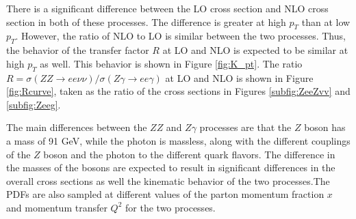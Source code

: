 \documentclass[12pt,a4paper,openright,twoside]{report}
\begin{document}
There is a significant difference between the LO cross section and NLO cross section in both of these processes. The difference is greater at high $p_T$ than at low $p_T$. However, the ratio of NLO to LO is similar between the two processes. Thus, the behavior of the transfer factor $R$ at LO and NLO is expected to be similar at high $p_T$ as well. This behavior is shown in Figure \ref{fig:K_pt}. The ratio $R = \sigma(ZZ\rightarrow ee\nu\nu)/\sigma(Z\gamma\rightarrow ee\gamma)$ at LO and NLO is shown in Figure \ref{fig:Rcurve}, taken as the ratio of the cross sections in Figures \ref{subfig:ZeeZvv} and \ref{subfig:Zeeg}.

The main differences between the $ZZ$ and $Z\gamma$ processes are that the $Z$ boson has a mass of 91 GeV, while the photon is massless, along with the different couplings of the $Z$ boson and the photon to the different quark flavors. The difference in the masses of the bosons are expected to result in significant differences in the overall cross sections as well the kinematic behavior of the two processes.The PDFs are also sampled at different values of the parton momentum fraction $x$ and momentum transfer $Q^2$ for the two processes. 
\end{document}
